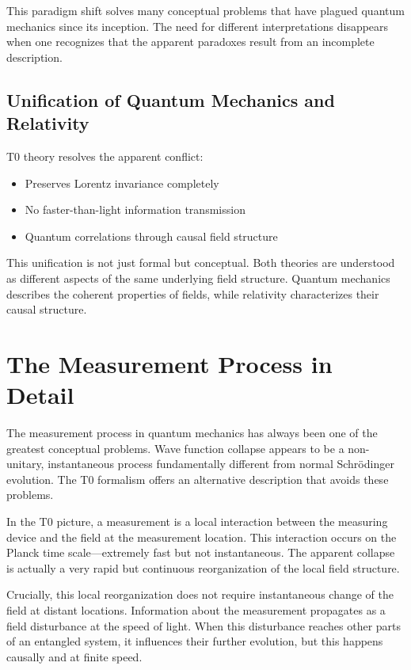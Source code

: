 	This paradigm shift solves many conceptual problems that have plagued quantum mechanics since its inception. The need for different interpretations disappears when one recognizes that the apparent paradoxes result from an incomplete description.
	
	\subsection{Unification of Quantum Mechanics and Relativity}
	
	T0 theory resolves the apparent conflict:
	\begin{itemize}
		\item Preserves Lorentz invariance completely
		\item No faster-than-light information transmission
		\item Quantum correlations through causal field structure
	\end{itemize}
	
	This unification is not just formal but conceptual. Both theories are understood as different aspects of the same underlying field structure. Quantum mechanics describes the coherent properties of fields, while relativity characterizes their causal structure.
	
	\section{The Measurement Process in Detail}
	
	The measurement process in quantum mechanics has always been one of the greatest conceptual problems. Wave function collapse appears to be a non-unitary, instantaneous process fundamentally different from normal Schrödinger evolution. The T0 formalism offers an alternative description that avoids these problems.
	
	In the T0 picture, a measurement is a local interaction between the measuring device and the field at the measurement location. This interaction occurs on the Planck time scale—extremely fast but not instantaneous. The apparent collapse is actually a very rapid but continuous reorganization of the local field structure.
	
	Crucially, this local reorganization does not require instantaneous change of the field at distant locations. Information about the measurement propagates as a field disturbance at the speed of light. When this disturbance reaches other parts of an entangled system, it influences their further evolution, but this happens causally and at finite speed.
	
